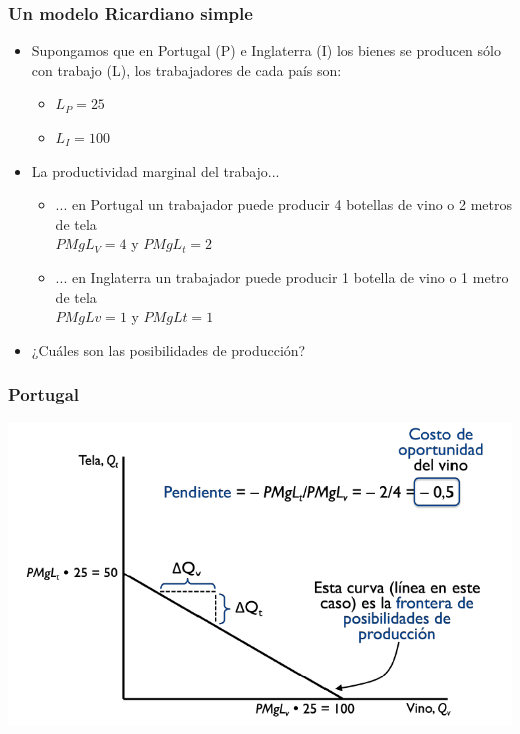 \documentclass{beamer}
\begin{document}
\begin{frame}
\frametitle{ Un modelo Ricardiano simple}
\begin{itemize}
    \item Supongamos que en Portugal (P) e Inglaterra (I) los bienes se producen sólo con trabajo (L), los trabajadores de cada país son:
    \begin{itemize}
        \item $L_P=25$
        \item $L_I=100$
    \end{itemize}
    \item La productividad marginal del trabajo... \begin{itemize}
        \item ... en Portugal un trabajador puede producir 4 botellas de vino o 2 metros de tela \\
        $PMgL_V = 4$ y $PMgL_t = 2$
        \item ... en Inglaterra un trabajador puede producir 1 botella de vino o 1 metro de tela \\
        $PMgLv = 1$ y $PMgLt = 1$
        \end{itemize} 
    \item ¿Cuáles son las posibilidades de producción?    
\end{itemize} 
\end{frame}

\begin{frame}
\frametitle{ Portugal}
\centering
\includegraphics[scale=0.6]{Figures/Tema_03_1_portugal.png}
\end{frame}
\end{document}
